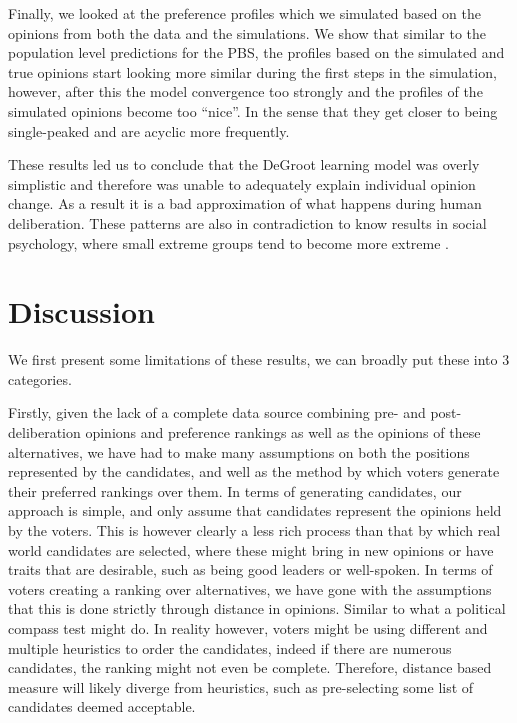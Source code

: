 Finally, we looked at the preference profiles which we simulated based on the
opinions from both the data and the simulations. We show that similar to the
population level predictions for the PBS, the profiles based on the simulated
and true opinions start looking more similar during the first steps in the
simulation, however, after this the model convergence too strongly and the profiles 
of the simulated opinions become too ``nice''. In the sense that they get closer 
to being single-peaked and are acyclic more frequently.

These results led us to conclude that the DeGroot learning model was overly
simplistic and therefore was unable to adequately explain individual opinion
change. As a result it is a bad approximation of what happens during human
deliberation. These patterns are also in contradiction to know results in 
social psychology, where small extreme groups tend to become more extreme \cite{myersPolarizingEffectGroup1975}.

\section{Discussion}

We first present some limitations of these results, we can broadly put these into 
3 categories.

Firstly, given the lack of a complete data source combining pre- and
post-deliberation opinions and preference rankings as well as the opinions of
these alternatives, we have had to make many assumptions on both the positions
represented by the candidates, and well as the method by which voters generate
their preferred rankings over them. In terms of generating candidates, our
approach is simple, and only assume that candidates represent the opinions held
by the voters. This is however clearly a less rich process than that by which
real world candidates are selected, where these might bring in new opinions or
have traits that are desirable, such as being good leaders or well-spoken. In
terms of voters creating a ranking over alternatives, we have gone with the
assumptions that this is done strictly through distance in opinions. Similar to
what a political compass test might do. In reality however, voters might be
using different and multiple heuristics to order the candidates, indeed if
there are numerous candidates, the ranking might not even be complete.
Therefore, distance based measure will likely diverge from heuristics, such as
pre-selecting some list of candidates deemed acceptable.



